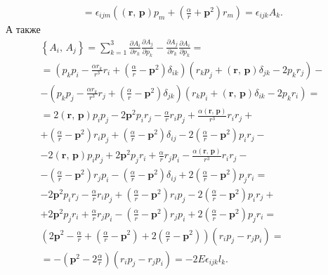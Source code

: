 \documentclass[a4paper]{article}
\begin{document}
\begin{sol}
\begin{multline*}
=\epsilon _{ijm}\left((\mathbf{r},\,\mathbf{p})p_m+
\left( \frac{\alpha}{r}+\mathbf{p}^2 \right) r_m\right)=
\epsilon _{ijk}A_k
.\end{multline*} 
А также
\begin{multline*}
\left\{ A_i,\,A_j \right\} =
\sum_{k=1}^{3} \frac{\partial A_i}{\partial r_k} 
\frac{\partial A_j}{\partial p_k} -
\frac{\partial A_j}{\partial r_k} \frac{\partial A_i}{\partial p_k} =\\=
\left(p_kp_i - \frac{\alpha r_k}{r^3}r_i+\left(\frac{\alpha}{r}-\mathbf{p}^2\right) \delta_{ik} \right)
\left(r_k p_j+(\mathbf{r},\,\mathbf{p})\delta_{jk}-2p_k r_j\right)-\\-
\left(p_kp_j - \frac{\alpha r_k}{r^3}r_j+\left(\frac{\alpha}{r}-\mathbf{p}^2\right) \delta_{jk} \right)
\left(r_k p_i+(\mathbf{r},\,\mathbf{p})\delta_{ik}-2p_k r_i\right)=\\=
2(\mathbf{r},\,\mathbf{p})p_ip_j-2\mathbf{p}^2p_i r_j-
\frac{\alpha}{r}r_i p_j+
\frac{\alpha(\mathbf{r},\,\mathbf{p})}{r^3}r_i r_j+\\+
\left( \frac{\alpha}{r}-\mathbf{p}^2 \right) r_i p_j
+\left( \frac{\alpha}{r}-\mathbf{p}^2 \right) \delta_{ij}-
2\left( \frac{\alpha}{r}-\mathbf{p}^2 \right) p_i r_j-\\
-2(\mathbf{r},\,\mathbf{p})p_ip_j+2\mathbf{p}^2p_j r_i+
\frac{\alpha}{r}r_j p_i-
\frac{\alpha(\mathbf{r},\,\mathbf{p})}{r^3}r_i r_j-\\-
\left( \frac{\alpha}{r}-\mathbf{p}^2 \right) r_j p_i
-\left( \frac{\alpha}{r}-\mathbf{p}^2 \right) \delta_{ij}+
2\left( \frac{\alpha}{r}-\mathbf{p}^2 \right) p_j r_i=\\
-2\mathbf{p}^2p_i r_j-
\frac{\alpha}{r}r_i p_j+
\left( \frac{\alpha}{r}-\mathbf{p}^2 \right) r_i p_j
-
2\left( \frac{\alpha}{r}-\mathbf{p}^2 \right) p_i r_j+\\
+2\mathbf{p}^2p_j r_i+
\frac{\alpha}{r}r_j p_i-
\left( \frac{\alpha}{r}-\mathbf{p}^2 \right) r_j p_i
+
2\left( \frac{\alpha}{r}-\mathbf{p}^2 \right) p_j r_i=\\
\left(2\mathbf{p}^2-
\frac{\alpha}{r}+
\left( \frac{\alpha}{r}-\mathbf{p}^2 \right)
+
2\left( \frac{\alpha}{r}-\mathbf{p}^2 \right)\right)(r_ip_j-r_jp_i)=\\=
-\left(\mathbf{p}^2 -2 \frac{\alpha}{r} \right) (r_i p_j
-r_j p_i)=-2E\epsilon _{ijk} l_k
.\end{multline*} 
\end{sol}
\begin{hiProb}[Упражнение 1.2]
\end{hiProb}
\end{document}
